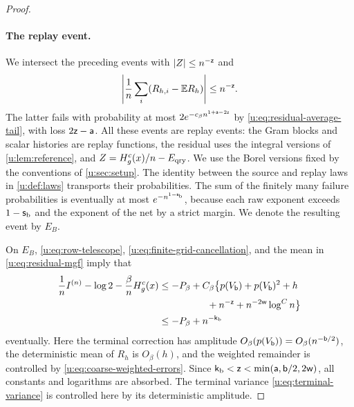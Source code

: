 \begin{proof}
\paragraph{The replay event.}
We intersect the preceding events with $|Z|\le n^{-\mathsf{z}}$ and
\[
 \left|\frac1n\sum_i(R_{h,i}-\mathbb E R_h)\right|\le n^{-\mathsf{z}}.
\]
The latter fails with probability at most $2e^{-c_\beta n^{1+\mathsf{a}-2\mathsf{z}}}$ by \eqref{u:eq:residual-average-tail}, with loss $2\mathsf{z}-\mathsf{a}$. All these events are replay events: the Gram blocks and scalar histories are replay functions, the residual uses the integral versions of \cref{u:lem:reference}, and $Z=H^c_g(x)/n-E_{\rm qry}$. We use the Borel versions fixed by the conventions of \cref{u:sec:setup}. The identity between the source and replay laws in \cref{u:def:laws} transports their probabilities. The sum of the finitely many failure probabilities is eventually at most $e^{-n^{1-\mathsf{s}_{\rm b}}}$, because each raw exponent exceeds $1-\mathsf{s}_{\rm b}$ and the exponent of the net by a strict margin. We denote the resulting event by $E_B$.

On $E_B$, \eqref{u:eq:row-telescope}, \eqref{u:eq:finite-grid-cancellation}, and the mean in \eqref{u:eq:residual-mgf} imply that
\begin{align*}
 \frac1nI^{(n)}-\log2-\frac\beta nH^c_g(x)
 &\le-P_\beta+C_\beta\bigl\{p(V_{\mathsf{b}})+p(V_{\mathsf{b}})^2+h\\
 &\hspace{5em}+n^{-\mathsf{z}}+n^{-2\mathsf{w}}\log^Cn\bigr\}\\
 &\le-P_\beta+n^{-\mathsf{k}_{\rm b}}
\end{align*}
eventually. Here the terminal correction has amplitude $O_\beta(p(V_{\mathsf{b}}))=O_\beta(n^{-\mathsf{b}/2})$, the deterministic mean of $R_h$ is $O_\beta(h)$, and the weighted remainder is controlled by \eqref{u:eq:coarse-weighted-errors}. Since $\mathsf{k}_{\rm b}<\mathsf{z}<\min(\mathsf{a},\mathsf{b}/2,2\mathsf{w})$, all constants and logarithms are absorbed. The terminal variance \eqref{u:eq:terminal-variance} is controlled here by its deterministic amplitude.


\end{proof}
